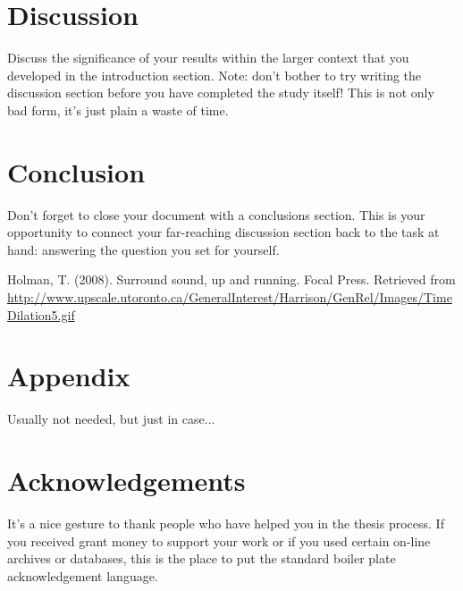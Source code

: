 \documentclass[twocolumn,12pt]{article}
\begin{document}
\section{Discussion}
Discuss the significance of your results within the larger context that you developed in the introduction section.  Note:  don't bother to try writing the discussion section before you have completed the study itself!  This is not only bad form, it's just plain a waste of time.


\section{Conclusion}
Don't forget to close your document with a conclusions section.  This is your opportunity to connect your far-reaching discussion section back to the task at hand:  answering the question you set for yourself.


\begin{thebibliography}{99}

Holman, T. (2008). Surround sound, up and running. Focal Press.
Retrieved from \url{http://www.upscale.utoronto.ca/GeneralInterest/Harrison/GenRel/Images/TimeDilation5.gif}  
\end{thebibliography}

\section{Appendix}

Usually not needed, but just in case...

\section{Acknowledgements}
It's a nice gesture to thank people who have helped you in the thesis process.  If you received grant money to support your work or if you used certain on-line archives or databases, this is the place to put the standard boiler plate acknowledgement language.
\end{document}
